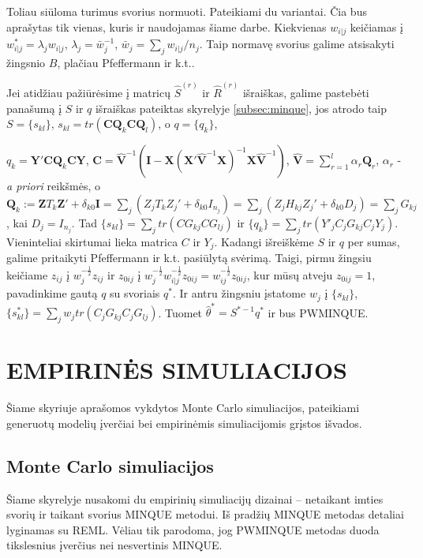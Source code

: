 \documentclass[12pt,a4paper]{article}
\begin{document}
\indent Toliau siūloma turimus svorius normuoti. Pateikiami du variantai. Čia bus aprašytas tik vienas, kuris ir naudojamas šiame darbe.  Kiekvienas $w_{i|j}$ keičiamas į $w_{i|j}^*=\lambda_jw_{i|j}$, $\lambda_j=\bar{w}_j^{-1}$, $\bar{w}_j=\sum_jw_{i|j}/n_j$. Taip normavę svorius galime atsisakyti žingsnio $B$, plačiau Pfeffermann ir k.t.\cite{pfeff}.

\indent Jei atidžiau pažiūrėsime į matricų $\hat{S}^{(r)}$ ir $\hat{R}^{(r)}$ išraiškas, galime pastebėti panašumą į $S$ ir $q$ išraiškas pateiktas skyrelyje \ref{subsec:minque}, jos atrodo taip $S=\{s_{kl}\}$, $s_{kl}=tr(\mathbf{CQ}_k\mathbf{CQ}_l)$, o
$q=\{q_k\}$,

\noindent $q_k=\mathbf{Y'CQ}_k\mathbf{CY}$, $\mathbf{C} = \mathbf{\hat{V}}^{-1}\left(\mathbf{I}-\mathbf{X}\left(\mathbf{X' \hat{V}}^{-1}\mathbf{X}\right)^{-1}\mathbf{X \hat{V}}^{-1}\right)$, $\mathbf{\hat{V}}=\sum^l_{r=1}\alpha_r\mathbf{Q}_r$, $\alpha_r$ - \textit{a priori} reikšmės, o $\mathbf{Q}_k:= \mathbf{Z}T_k\mathbf{Z'}+\delta_{k0}\mathbf{I}=\sum_j(Z_jT_kZ_j'+\delta_{k0}I_{n_j})=\sum_j(Z_jH_{kj}Z_j'+\delta_{k0}D_j)=\sum_jG_{kj}$, kai $D_j=I_{n_j}$. Tad $\{s_{kl}\}=\sum_jtr(CG_{kj}CG_{lj})$ ir $\{q_k\}=\sum_jtr(Y'_jC_jG_{kj}C_jY_j)$. Vieninteliai skirtumai lieka matrica $C$ ir $Y_j$. Kadangi išreiškėme $S$ ir $q$ per sumas, galime pritaikyti  Pfeffermann ir k.t.\cite{pfeff} pasiūlytą svėrimą. Taigi, pirmu žingsiu keičiame $z_{ij}$ į $w_j^{-\frac{1}{2}}z_{ij}$ ir $z_{0ij}$ į $w_j^{-\frac{1}{2}}w_{i|j}^{-\frac{1}{2}}z_{0ij}=w_{ij}^{-\frac{1}{2}}z_{0ij}$, kur mūsų atveju $z_{0ij}=1$, pavadinkime gautą $q$ su svoriais $q^*$. Ir antru žingsniu įstatome $w_j$ į $\{s_{kl}\}$, $\{s^*_{kl}\}=\sum_jw_jtr(C_jG_{kj}C_jG_{lj})$. Tuomet $\hat{\theta}^*=S^{*-1}q^*$ ir bus PWMINQUE.





\newpage
\section{EMPIRINĖS SIMULIACIJOS} \label{sec:simul}
\indent Šiame skyriuje aprašomos vykdytos Monte Carlo simuliacijos, pateikiami generuotų modelių įverčiai bei empirinėmis simuliacijomis grįstos išvados.


\subsection{Monte Carlo simuliacijos}
\indent Šiame skyrelyje nusakomi du empirinių simuliacijų dizainai -- netaikant imties svorių ir taikant svorius MINQUE metodui. Iš pradžių MINQUE metodas detaliai lyginamas su REML. Vėliau tik parodoma, jog PWMINQUE metodas duoda tikslesnius įverčius nei nesvertinis MINQUE.
\end{document}

